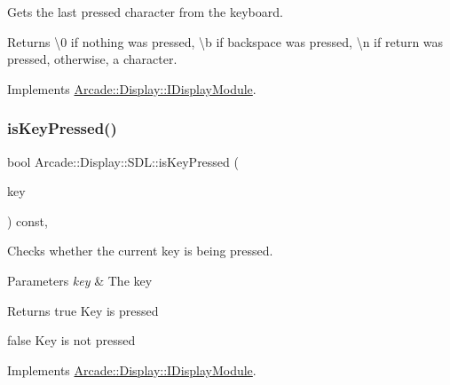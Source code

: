Gets the last pressed character from the keyboard. 

\begin{DoxyReturn}{Returns}
\textbackslash{}0 if nothing was pressed, \textbackslash{}b if backspace was pressed, \textbackslash{}n if return was pressed, otherwise, a character. 
\end{DoxyReturn}


Implements \mbox{\hyperlink{classArcade_1_1Display_1_1IDisplayModule_a403f8a0f065dad707a881ef3cee79805}{Arcade\+::\+Display\+::\+I\+Display\+Module}}.

\mbox{\label{classArcade_1_1Display_1_1SDL_ab7a692d8968af7633a92042ee006b83a}} 
\subsubsection{\texorpdfstring{isKeyPressed()}{isKeyPressed()}}
{\footnotesize\ttfamily bool Arcade\+::\+Display\+::\+S\+D\+L\+::is\+Key\+Pressed (\begin{DoxyParamCaption}\item[{\mbox{\hyperlink{classArcade_1_1Display_1_1IDisplayModule_a8da3f6b309ca0581473ae8cc8789b619}{I\+Display\+Module\+::\+Keys}}}]{key }\end{DoxyParamCaption}) const\hspace{0.3cm}{\ttfamily [final]}, {\ttfamily [virtual]}}



Checks whether the current key is being pressed. 


\begin{DoxyParams}{Parameters}
{\em key} & The key \\
\hline
\end{DoxyParams}
\begin{DoxyReturn}{Returns}
true Key is pressed 

false Key is not pressed 
\end{DoxyReturn}


Implements \mbox{\hyperlink{classArcade_1_1Display_1_1IDisplayModule_af871661ff84c21581cd7233ba6f27aa0}{Arcade\+::\+Display\+::\+I\+Display\+Module}}.

\mbox{\label{classArcade_1_1Display_1_1SDL_a14dd612e3902b1daa1d31cca71efcf00}} 
